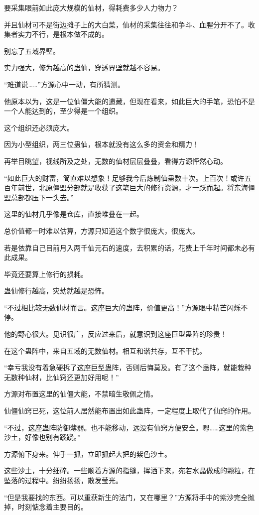 \begin{this_body}
要采集眼前如此庞大规模的仙材，得耗费多少人力物力？

并且仙材可不是街边摊子上的大白菜，仙材的采集往往和争斗、血腥分开不了。收集者实力不行，是根本做不成的。

别忘了五域界壁。

实力强大，修为越高的蛊仙，穿透界壁就越不容易。

“难道说……”方源心中一动，有所猜测。

他原本以为，这是一位仙僵大能的遗藏，但现在看来，如此巨大的手笔，恐怕不是一个人能达到的，至少得是一个组织。

这个组织还必须庞大。

因为小型组织，两三位蛊仙，根本就没有这么多的资金和精力！

再举目眺望，视线所及之处，无数的仙材层层叠叠，看得方源怦然心动。

“如此巨大的财富，简直难以想象！足够我今后炼制仙蛊数十次。上百次！或许五百年前世，北原僵盟分部就是收获了这笔巨大的修行资源，才一跃而起。将东海僵盟总部都压下一头去。”

这里的仙材几乎像是仓库，直接堆叠在一起。

总价值都一时难以估算，方源只知道这个数字很庞大，很庞大。

若是依靠自己目前月入两千仙元石的速度，去积累的话，花费上千年时间都未必有此成果。

毕竟还要算上修行的损耗。

蛊仙修行越高，灾劫就越是恐怖。

“不过相比较无数仙材而言。这座巨大的蛊阵，价值更高！”方源眼中精芒闪烁不停。

他的野心很大。见识很广，反应过来后，就意识到这座巨型蛊阵的珍贵！

在这个蛊阵中，来自五域的无数仙材。相互和谐共存，互不干扰。

“幸亏我没有着急硬拆了这座巨型蛊阵，否则后悔莫及。有了这个蛊阵，就能栽种无数种仙材，比仙窍还更加好用呢！”

方源对布置这里的仙僵大能，不禁暗生敬佩之情。

仙僵仙窍已死，这位前人居然能布置出如此蛊阵，一定程度上取代了仙窍的作用。

“不过，这座蛊阵防御薄弱。也不能移动，远没有仙窍方便安全。嗯……这里的紫色沙土，好像也别有蹊跷。”

方源俯下身来。伸手一抓，立即抓起大把的紫色沙土。

这些沙土，十分细碎。一些顺着方源的指缝，挥洒下来，宛若水晶做成的颗粒，在坠落的过程中。纷纷扬扬，散发莹光。

“但是我要找的东西。可以重获新生的法门，又在哪里？”方源将手中的紫沙完全抛掉，时刻惦念着主要目的。


\end{this_body}
